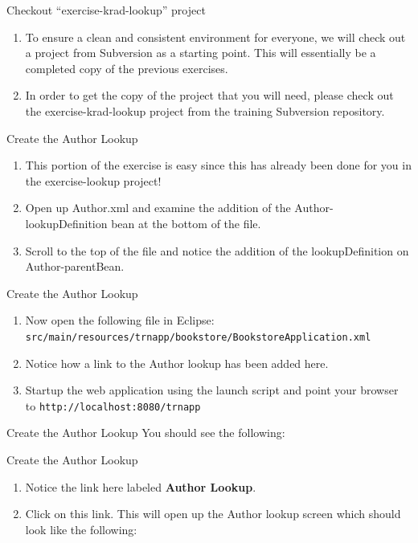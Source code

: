 \documentclass[xcolor=dvipsnames,14pt,professionalfonts]{beamer}
\begin{document}
\begin{frame}{Checkout “exercise-krad-lookup” project}
  \begin{enumerate}
    \item To ensure a clean and consistent environment for everyone, we will check out a project from Subversion as a starting point.  This will essentially be a completed copy of the previous exercises.
    \item In order to get the copy of the project that you will need,
      please check out the exercise-krad-lookup project from the
      training Subversion repository.
    \end{enumerate}
  \end{frame}

\begin{frame}{Create the Author Lookup}
  \begin{enumerate}
    \item This portion of the exercise is easy since this has already been done for you in the exercise-lookup project!
    \item Open up Author.xml and examine the addition of the Author-lookupDefinition bean at the bottom of the file.
    \item Scroll to the top of the file and notice the addition of the
      lookupDefinition on Author-parentBean.
    \end{enumerate}
  \end{frame}

\begin{frame}{Create the Author Lookup}
  \begin{enumerate}
  \item Now open the following file in Eclipse: 
    \texttt{src/main/resources/trnapp/bookstore/BookstoreApplication.xml}
  \item Notice how a link to the Author lookup has been added here.
  \item Startup the web application using the launch script and point
    your browser to \texttt{http://localhost:8080/trnapp}
    \end{enumerate}
  \end{frame}

\begin{frame}{Create the Author Lookup}
  You should see the following:
\end{frame}

\begin{frame}{Create the Author Lookup}
  \begin{enumerate}
    \item Notice the link here labeled \textbf{Author Lookup}.  
    \item Click on this link. This will open up the Author lookup screen which should look like the following:
    \end{enumerate}
  \end{frame}
\end{document}
